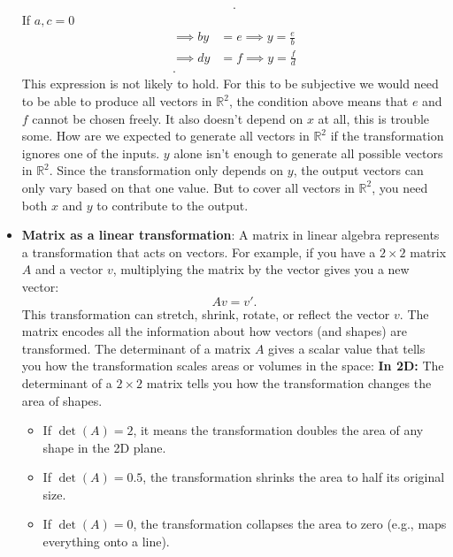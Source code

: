 \documentclass{report}
\begin{document}
\begin{itemize}
\begin{align*}
                .\end{align*}
                If $a,c = 0 $
                \begin{align*}
                    \implies by &= e  \implies y = \frac{e}{b}\\
                    \implies dy &= f \implies y = \frac{f}{d}\\
                .\end{align*}
                This expression is not likely to hold. For this to be subjective we would need to be able to produce all vectors in $\mathbb{R}^{2}$, the condition above means that $e$ and $f$ cannot be chosen freely. It also doesn't depend on $x$ at all, this is trouble some. How are we expected to generate all vectors in $\mathbb{R}^{2}$ if the transformation ignores one of the inputs. $y$ alone isn't enough to generate all possible vectors in $\mathbb{R}^{2}$. Since the transformation only depends on $y$, the output vectors can only vary based on that one value. But to cover all vectors in $\mathbb{R}^{2}$, you need both $x$ and $y$ to contribute to the output.
            \item \textbf{Matrix as a linear transformation}:
                A matrix in linear algebra represents a transformation that acts on vectors. For example, if you have a $2 \times 2$ matrix $A$ and a vector $v$, multiplying the matrix by the vector gives you a new vector:
                \[
                    A v = v'.
                \]
                This transformation can stretch, shrink, rotate, or reflect the vector $v$. The matrix encodes all the information about how vectors (and shapes) are transformed.
                \bigbreak \noindent 
                The determinant of a matrix $A$ gives a scalar value that tells you how the transformation scales areas or volumes in the space:
                \bigbreak \noindent 
                \textbf{In 2D:} The determinant of a $2 \times 2$ matrix tells you how the transformation changes the area of shapes. 
                \begin{itemize}
                    \item If $\det(A) = 2$, it means the transformation doubles the area of any shape in the 2D plane. 
                    \item If $\det(A) = 0.5$, the transformation shrinks the area to half its original size. 
                    \item If $\det(A) = 0$, the transformation collapses the area to zero (e.g., maps everything onto a line).
                \end{itemize}

\end{itemize}
\end{document}
